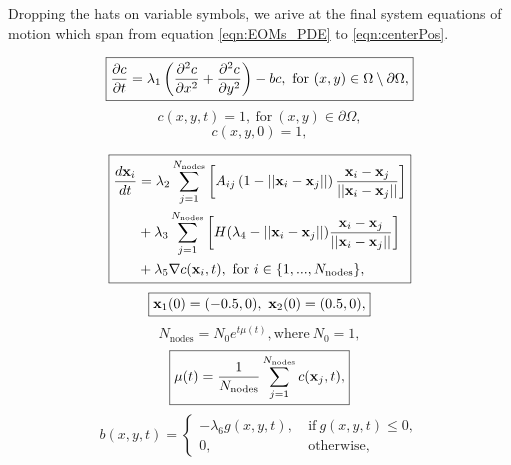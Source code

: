 Dropping the hats on variable symbols, we arive at the final system equations of motion which
span from equation \ref{eqn:EOMs_PDE} to \ref{eqn:centerPos}.
\newpage


\begin{equation} \label{eqn:EOMs_PDE}
    \boxed{\pdv{c}{t} = \lambda_1 \left(\pdv[2]{c}{x} + \pdv[2]{c}{y} \right) - bc,
     \ \textrm{for} \ (x,y) \in \Omega \setminus \partial \Omega,}
\end{equation}
\begin{equation}
    \boxed{c(x,y,t) = 1, \ \textrm{for} \ (x,y) \in \partial \Omega,}
\end{equation}
\begin{equation}
    \boxed{c(x,y,0) = 1,}
\end{equation}

\begin{equation}
    \boxed{
    \begin{split}
        \frac{d \vb{x}_i}{d t} 
         &= \lambda_2 \sum_{j=1}^{N_{\textrm{nodes}}} \left[ A_{ij}\left( 1- ||\vb{x}_i - \vb{x}_j|| \right) \frac{\vb{x}_i - \vb{x}_j}{||\vb{x}_i - \vb{x}_j||} \right]\\
         &+ \lambda_3 \sum_{j=1}^{N_{\textrm{nodes}}} \left[H(\lambda_4 - ||\vb{x}_i - \vb{x}_j||) \frac{\vb{x}_i - \vb{x}_j}{||\vb{x}_i - \vb{x}_j||}     \right]\\ 
         &+ \lambda_5 \nabla c (\vb{x}_i, t), \ \textrm{for} \ i \in \{ 1, ...,N_{\textrm{nodes}} \},  
    \end{split}}
\end{equation}
\begin{equation}
    \boxed{\vb{x}_1(0) = (-0.5, 0), \ \vb{x}_2(0) = (0.5, 0), }
\end{equation}
\begin{equation}
    \boxed{N_{\textrm{nodes}} = N_0 e^{t \mu(t)}, \textrm{where} \ N_0 = 1, }
\end{equation}
\begin{equation} 
    \boxed{\mu(t) = \frac{1}{N_{\textrm{nodes}}}\sum_{j=1}^{N_{\textrm{nodes}}} c(\vb{x}_j, t), } 
\end{equation}
\begin{equation}
    \boxed{
    b(x,y,t) = 
    \begin{cases}
        -\lambda_6 g(x,y,t), & \ \textrm{if} \ g(x,y,t) \leq 0, \\
            0, &    \ \textrm{otherwise},
    \end{cases}
    }
\end{equation}
